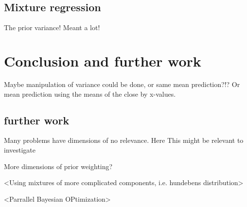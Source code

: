 \section{Mixture regression}
The prior variance! Meant a lot!



\chapter{Conclusion and further work}


Maybe manipulation of variance could be done, or same mean prediction?!? Or 
mean prediction using the means of the close by x-values. 

\section{further work}
Many problems have dimensions of no relevance. Here This might be relevant to investigate

More dimensions of prior weighting?

<Using mixtures of more complicated components, i.e. hundebens distribution>
 
<Parrallel Bayesian OPtimization>

